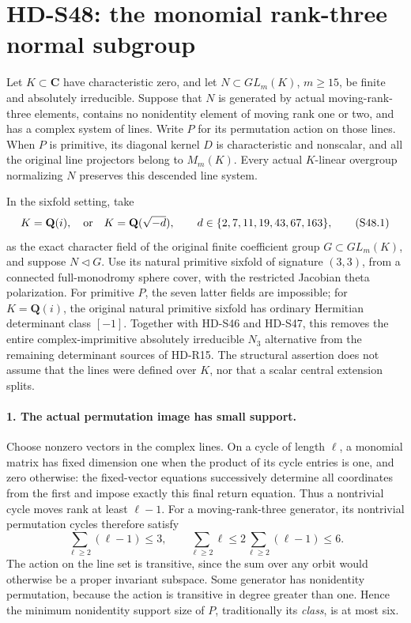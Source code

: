 \section{HD-S48: the monomial rank-three normal subgroup}
\label{sec:monomial-rank-three-scope}

Let \(K\subset\mathbf C\) have characteristic zero, and let
\(N\subset GL_m(K)\), \(m\ge15\), be finite and absolutely
irreducible. Suppose that \(N\) is generated by actual
moving-rank-three elements, contains no nonidentity element of
moving rank one or two, and has a complex system of lines.
Write \(P\) for its permutation action on those lines.
When \(P\) is primitive, its diagonal kernel \(D\) is
characteristic and nonscalar, and all the original line projectors
belong to \(M_m(K)\). Every actual \(K\)-linear overgroup
normalizing \(N\) preserves this descended line system.

In the sixfold setting, take
\[
 K=\mathbf Q(i),\quad\hbox{or}\quad
 K=\mathbf Q(\sqrt{-d}),\qquad
 d\in\{2,7,11,19,43,67,163\},
 \tag{S48.1}
\]
as the exact character field of the original finite coefficient
group \(G\subset GL_m(K)\), and suppose \(N\triangleleft G\).
Use its natural primitive sixfold of signature \((3,3)\),
from a connected full-monodromy sphere cover, with the
restricted Jacobian theta polarization.
For primitive \(P\), the seven latter fields are impossible;
for \(K=\mathbf Q(i)\), the original natural primitive
sixfold has ordinary Hermitian determinant class \([-1]\).
Together with HD-S46 and HD-S47, this removes the entire
complex-imprimitive absolutely irreducible \(N_3\) alternative
from the remaining determinant sources of HD-R15.
The structural assertion does not assume that the lines were
defined over \(K\), nor that a scalar central extension splits.

\paragraph{1. The actual permutation image has small support.}
Choose nonzero vectors in the complex lines. On a cycle of
length \(\ell\), a monomial matrix has fixed dimension one
when the product of its cycle entries is one, and zero otherwise:
the fixed-vector equations successively determine all coordinates
from the first and impose exactly this final return equation.
Thus a nontrivial cycle moves rank at least \(\ell-1\).
For a moving-rank-three generator, its nontrivial permutation
cycles therefore satisfy
\[
 \sum_{\ell\ge2}(\ell-1)\le3,
 \qquad
 \sum_{\ell\ge2}\ell\le
          2\sum_{\ell\ge2}(\ell-1)\le6.
 \tag{S48.2}
\]
The action on the line set is transitive, since the sum over
any orbit would otherwise be a proper invariant subspace.
Some generator has nonidentity permutation, because the action
is transitive in degree greater than one. Hence the minimum
nonidentity support size of \(P\), traditionally its
\emph{class}, is at most six.

